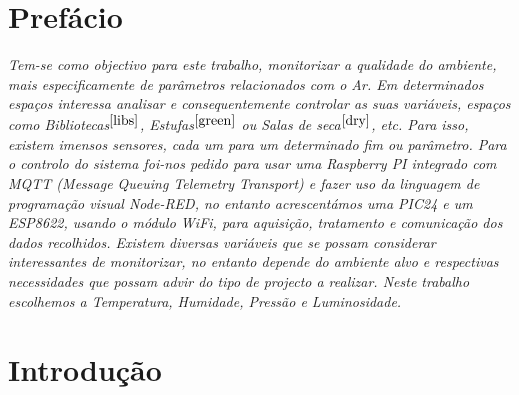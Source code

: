 \documentclass[12pt]{article}
\begin{document}
\section{Prefácio}

\textit{Tem-se como objectivo para este trabalho, monitorizar a qualidade do ambiente, mais especificamente de parâmetros relacionados com o Ar. Em determinados espaços interessa analisar e consequentemente controlar as suas variáveis, espaços como Bibliotecas$^{\cite{libs}}$, Estufas$^{\cite{green}}$ ou Salas de seca$^{\cite{dry}}$, etc. Para isso, existem imensos sensores, cada um para um determinado fim ou parâmetro. Para o controlo do sistema foi-nos pedido para usar uma Raspberry PI integrado com MQTT (Message Queuing Telemetry Transport) e fazer uso da linguagem de programação visual Node-RED, no entanto acrescentámos uma PIC24 e um ESP8622, usando o módulo WiFi, para aquisição, tratamento e comunicação dos dados recolhidos. Existem diversas variáveis que se possam considerar interessantes de monitorizar, no entanto depende do ambiente alvo e respectivas necessidades que possam advir do tipo de projecto a realizar. Neste trabalho escolhemos a Temperatura, Humidade, Pressão e Luminosidade.}


\section{Introdução}
\end{document}
